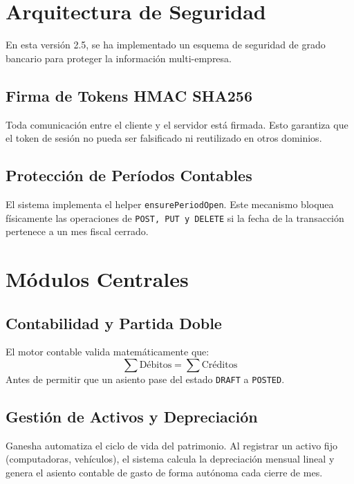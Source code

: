 \documentclass[12pt, a4paper, oneside]{book}
\begin{document}
\chapter{Arquitectura de Seguridad}
En esta versión 2.5, se ha implementado un esquema de seguridad de grado bancario para proteger la información multi-empresa.

\section{Firma de Tokens HMAC SHA256}
Toda comunicación entre el cliente y el servidor está firmada. Esto garantiza que el token de sesión no pueda ser falsificado ni reutilizado en otros dominios.

\section{Protección de Períodos Contables}
El sistema implementa el helper \texttt{ensurePeriodOpen}. Este mecanismo bloquea físicamente las operaciones de \texttt{POST, PUT y DELETE} si la fecha de la transacción pertenece a un mes fiscal cerrado.

\chapter{Módulos Centrales}

\section{Contabilidad y Partida Doble}
El motor contable valida matemáticamente que:
\begin{equation}
    \sum \text{Débitos} = \sum \text{Créditos}
\end{equation}
Antes de permitir que un asiento pase del estado \texttt{DRAFT} a \texttt{POSTED}.

\section{Gestión de Activos y Depreciación}
Ganesha automatiza el ciclo de vida del patrimonio. Al registrar un activo fijo (computadoras, vehículos), el sistema calcula la depreciación mensual lineal y genera el asiento contable de gasto de forma autónoma cada cierre de mes.
\end{document}
